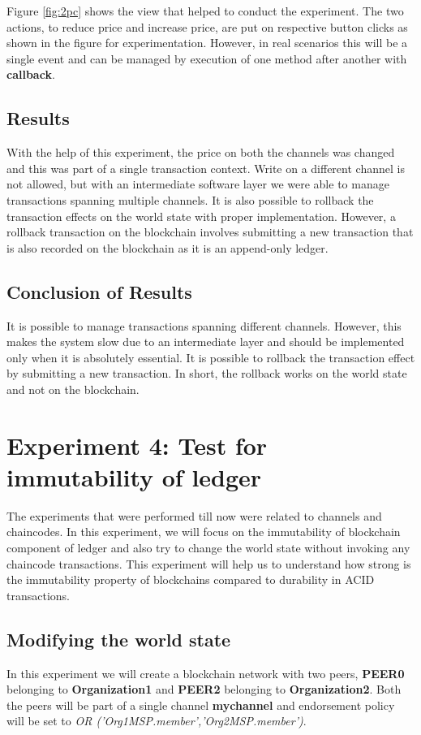 \documentclass[
  a4paper,  %
  twoside,  %
  bibliography=totoc,
  headsepline,
  cleardoublepage=empty,
  parskip=half,
  draft=false
]{scrbook}
\begin{document}
Figure \ref{fig:2pc} shows the view that helped to conduct the experiment. The two actions, to reduce price and increase price, are put on respective button clicks as shown in the figure for experimentation. However, in real scenarios this will be a single event and can be managed by execution of one method after another with \textbf{callback}.

\subsection{Results}
With the help of this experiment, the price on both the channels was changed and this was part of a single transaction context. Write on a different channel is not allowed, but with an intermediate software layer we were able to manage transactions spanning multiple channels. It is also possible to rollback the transaction effects on the world state with proper implementation. However, a rollback transaction on the blockchain involves submitting a new transaction that is also recorded on the blockchain as it is an append-only ledger. 

\subsection{Conclusion of Results}
It is possible to manage transactions spanning different channels. However, this makes the system slow due to an intermediate layer and should be implemented only when it is absolutely essential. It is possible to rollback the transaction effect by submitting a new transaction. In short, the rollback works on the world state and not on the blockchain.

\section{Experiment 4: Test for immutability of ledger}
The experiments that were performed till now were related to channels and chaincodes. In this experiment, we will focus on the immutability of blockchain component of ledger and also try to change the world state without invoking any chaincode transactions. This experiment will help us to understand how strong is the immutability property of blockchains compared to durability in ACID transactions.

\subsection{Modifying the world state}
In this experiment we will create a blockchain network with two peers, \textbf{PEER0} belonging to \textbf{Organization1} and \textbf{PEER2} belonging to \textbf{Organization2}. Both the peers will be part of a single channel \textbf{mychannel} and endorsement policy will be set to \textit{OR ('Org1MSP.member','Org2MSP.member')}.
\end{document}
